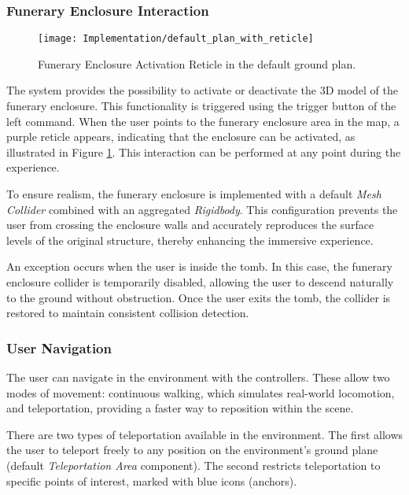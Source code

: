 \subsubsection{Funerary Enclosure Interaction}
\label{sec:funerary_interaction}

 \begin{figure}[h!]
    \centering
    \texttt{[image: Implementation/default\_plan\_with\_reticle]}
    \caption{Funerary Enclosure Activation Reticle in the default ground plan.}
    \label{fig:funerary_interaction}    
\end{figure}

The system provides the possibility to activate or deactivate the \gls{3D} model of the funerary enclosure.
This functionality is triggered using the trigger button of the left command. When the user points to the funerary enclosure area in the map, a purple reticle appears, indicating that the enclosure can be activated, as illustrated in Figure \ref{fig:funerary_interaction}. This interaction can be performed at any point during the experience.

To ensure realism, the funerary enclosure is implemented with a default \emph{Mesh Collider} combined with an aggregated \emph{Rigidbody}. This configuration prevents the user from crossing the enclosure walls and accurately reproduces the surface levels of the original structure, thereby enhancing the immersive experience.

An exception occurs when the user is inside the tomb. In this case, the funerary enclosure collider is temporarily disabled, allowing the user to descend naturally to the ground without obstruction. Once the user exits the tomb, the collider is restored to maintain consistent collision detection.

\subsubsection{User Navigation}
\label{sec:user_navigation}

The user can navigate in the environment with the controllers. 
These allow two modes of movement: continuous walking, which simulates real-world locomotion, and teleportation, providing a faster way to reposition within the scene.

There are two types of teleportation available in the environment. The first allows the user to teleport freely to any position on the environment’s ground plane (default \emph{Teleportation Area} component). The second restricts teleportation to specific points of interest, marked with blue icons (anchors).

